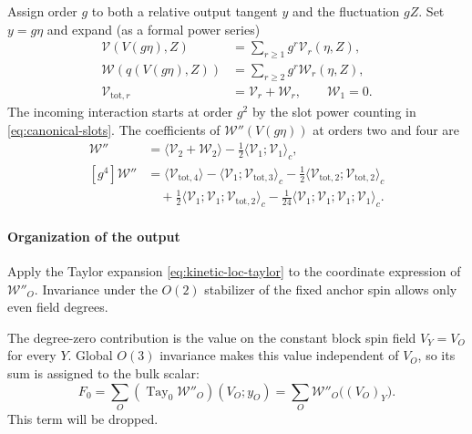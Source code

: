 \documentclass[11pt]{article}
\newcommand{\Tay}{\operatorname{Tay}}
\numberwithin{equation}{section}
\theoremstyle{definition}
\theoremstyle{plain}
\begin{document}
Assign order $g$ to both a relative output tangent $y$ and the
fluctuation $gZ$.  Set $y=g\eta$ and expand (as a formal power series)
\begin{align}
 \mathcal V(V(g\eta),Z)
   &=\sum_{r\ge1}g^r\mathcal V_r(\eta,Z),\\
 \mathcal W(q(V(g\eta),Z))
   &=\sum_{r\ge2}g^r\mathcal W_r(\eta,Z),\\
 \mathcal V_{\mathrm{tot},r}
   &=\mathcal V_r+\mathcal W_r,\qquad \mathcal W_1=0.
 \label{eq:pert-vertex-orders}
\end{align}
The incoming interaction starts at order $g^2$ by the slot
power counting in \eqref{eq:canonical-slots}.
The coefficients of $\mathcal W''(V(g\eta))$ at orders two and four are
\begin{align}
 [g^2]\mathcal W''
 &=\langle \mathcal V_2+\mathcal W_2\rangle
   -\tfrac12\langle \mathcal V_1;\mathcal V_1\rangle_c,\\
 [g^4]\mathcal W''
 &=\langle \mathcal V_{\mathrm{tot},4}\rangle
   -\langle \mathcal V_1;\mathcal V_{\mathrm{tot},3}\rangle_c
   -\tfrac12\langle \mathcal V_{\mathrm{tot},2};
                         \mathcal V_{\mathrm{tot},2}\rangle_c\nonumber\\
 &\quad+\tfrac12\langle \mathcal V_1;\mathcal V_1;
                              \mathcal V_{\mathrm{tot},2}\rangle_c
   -\tfrac1{24}\langle \mathcal V_1;\mathcal V_1;
                        \mathcal V_1;\mathcal V_1\rangle_c.
 \label{eq:pert-cumulant-coefficients}
\end{align}

\paragraph{Organization of the output}

Apply the Taylor expansion \eqref{eq:kinetic-loc-taylor} to the coordinate expression
of $\mathcal W''_O$.
Invariance under the $O(2)$ stabilizer of the fixed anchor spin
allows only even field degrees.

The degree-zero contribution is the value on the
constant block spin field $V_Y=V_O$ for every $Y$.  Global $O(3)$ invariance
makes this value independent of $V_O$, so its sum is assigned to
the bulk scalar:
\begin{equation}
  F_0 
  =\sum_O(\Tay_0\mathcal W''_O)(V_O;y_O)
  =\sum_O\mathcal W''_O\bigl((V_O)_Y\bigr).
\end{equation}
This term will be dropped.
\end{document}
